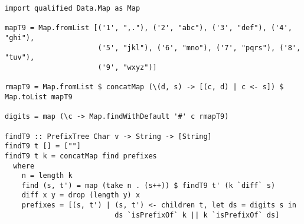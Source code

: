 \documentclass{ctexart}
\begin{document}
\lstset{language=Haskell}
\begin{lstlisting}[caption=T9查找]
import qualified Data.Map as Map

mapT9 = Map.fromList [('1', ",."), ('2', "abc"), ('3', "def"), ('4', "ghi"),
                      ('5', "jkl"), ('6', "mno"), ('7', "pqrs"), ('8', "tuv"),
                      ('9', "wxyz")]

rmapT9 = Map.fromList $ concatMap (\(d, s) -> [(c, d) | c <- s]) $ Map.toList mapT9

digits = map (\c -> Map.findWithDefault '#' c rmapT9)

findT9 :: PrefixTree Char v -> String -> [String]
findT9 t [] = [""]
findT9 t k = concatMap find prefixes
  where
    n = length k
    find (s, t') = map (take n . (s++)) $ findT9 t' (k `diff` s)
    diff x y = drop (length y) x
    prefixes = [(s, t') | (s, t') <- children t, let ds = digits s in
                          ds `isPrefixOf` k || k `isPrefixOf` ds]
\end{lstlisting}

\ifx\wholebook\relax \else
\end{document}
